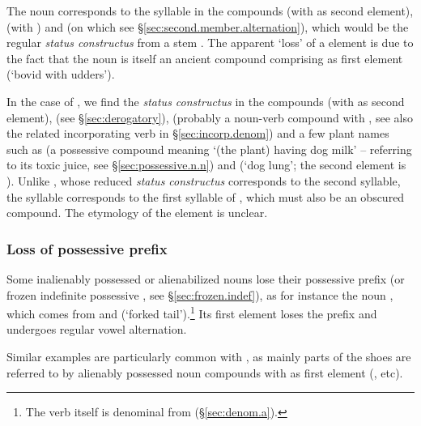 The noun  corresponds to the syllable  in the compounds  (with  as second element),  (with ) and  (on which see §\ref{sec:second.member.alternation}), which would be the regular \textit{status constructus} from a stem . The apparent `loss' of a  element is due to the fact that the noun  is itself an ancient compound comprising  as first element (`bovid with udders').

In the case of , we find the \textit{status constructus}  in the compounds  (with  as second element),  (see §\ref{sec:derogatory}),  (probably a noun-verb compound with , see also the related incorporating verb in §\ref{sec:incorp.denom}) and a few plant names such as  (a possessive compound meaning `(the plant) having dog milk' -- referring to its toxic juice, see §\ref{sec:possessive.n.n}) and  (`dog lung'; the second element is ). Unlike  , whose reduced \textit{status constructus} corresponds to the second syllable, the syllable  corresponds to the first syllable of , which must also be an obscured compound. The etymology of  the element  is unclear.

\subsubsection{Loss of possessive prefix} \label{sec:loss.possessive.prefix.compounds}
Some inalienably possessed or alienabilized nouns lose their possessive prefix (or frozen indefinite possessive , see §\ref{sec:frozen.indef}), as for instance the noun  , which comes from  and  (`forked tail').\footnote{The verb  itself is denominal from  (§\ref{sec:denom.a}).} Its first element  loses the prefix  and undergoes regular vowel alternation. 

Similar examples are particularly common with , as mainly parts of the shoes are referred to by alienably possessed noun compounds with  as first element (,  etc).


